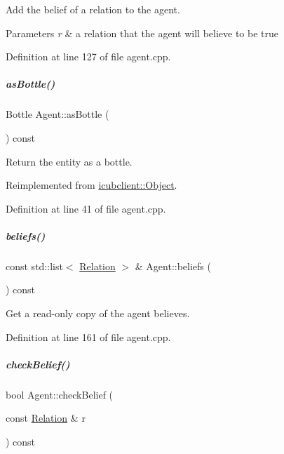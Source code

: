 Add the belief of a relation to the agent. 


\begin{DoxyParams}{Parameters}
{\em r} & a relation that the agent will believe to be true \\
\hline
\end{DoxyParams}


Definition at line 127 of file agent.\+cpp.

\mbox{\label{group__icubclient__representations_a7969e73f3ee81ba44e36211807666033}} 
\subparagraph{\texorpdfstring{as\+Bottle()}{asBottle()}}
{\footnotesize\ttfamily Bottle Agent\+::as\+Bottle (\begin{DoxyParamCaption}{ }\end{DoxyParamCaption}) const\hspace{0.3cm}{\ttfamily [virtual]}}



Return the entity as a bottle. 



Reimplemented from \hyperlink{group__icubclient__representations_a60acd95fa583dc758f2b76e1968a7ea2}{icubclient\+::\+Object}.



Definition at line 41 of file agent.\+cpp.

\mbox{\label{group__icubclient__representations_ae17b4238ba14a8a0b19a238a333d6472}} 
\subparagraph{\texorpdfstring{beliefs()}{beliefs()}}
{\footnotesize\ttfamily const std\+::list$<$ \hyperlink{group__icubclient__representations_classicubclient_1_1Relation}{Relation} $>$ \& Agent\+::beliefs (\begin{DoxyParamCaption}{ }\end{DoxyParamCaption}) const}



Get a read-\/only copy of the agent believes. 



Definition at line 161 of file agent.\+cpp.

\mbox{\label{group__icubclient__representations_aecc3b845c448a87061534928d125f1e4}} 
\subparagraph{\texorpdfstring{check\+Belief()}{checkBelief()}}
{\footnotesize\ttfamily bool Agent\+::check\+Belief (\begin{DoxyParamCaption}\item[{const \hyperlink{group__icubclient__representations_classicubclient_1_1Relation}{Relation} \&}]{r }\end{DoxyParamCaption}) const}



